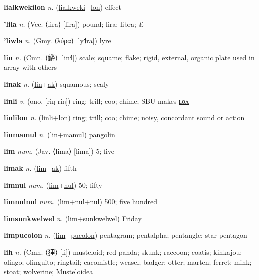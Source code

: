 \textbf{\hypertarget{lialkwekilon}{lialkwekilon}} \textit{n.} (\hyperlink{lialkweki}{lialkweki}+\allowbreak \hyperlink{lon}{lon})
effect

\textbf{\hypertarget{'lila}{'lila}} \textit{n.} (Vec. ⟨lira⟩ [lira])
pound; lira; libra; £

\textbf{\hypertarget{'liwla}{'liwla}} \textit{n.} (Gmy. ⟨λύρα⟩ [ly˦ra])
lyre

\textbf{\hypertarget{lin}{lin}} \textit{n.} (Cmn. ⟨{\chinese{}鳞}⟩ [lin˧˥])
scale; squame; flake; rigid, external, organic plate used in array with others

\textbf{\hypertarget{linak}{linak}} \textit{n.} (\hyperlink{lin}{lin}+\allowbreak \hyperlink{ak}{ak})
squamous; scaly

\textbf{\hypertarget{linli}{linli}} \textit{v.} (ono. [riŋ riŋ])
ring; trill; coo; chime; SBU makes \hyperlink{linlilon}{ʟᴏᴧ}

\textbf{\hypertarget{linlilon}{linlilon}} \textit{n.} (\hyperlink{linli}{linli}+\allowbreak \hyperlink{lon}{lon})
ring; trill; coo; chime; noisy, concordant sound or action

\textbf{\hypertarget{linmamul}{linmamul}} \textit{n.} (\hyperlink{lin}{lin}+\allowbreak \hyperlink{mamul}{mamul})
pangolin

\textbf{\hypertarget{lim}{lim}} \textit{num.} (Jav. ⟨lima⟩ [lima])
5; five

\textbf{\hypertarget{limak}{limak}} \textit{n.} (\hyperlink{lim}{lim}+\allowbreak \hyperlink{ak}{ak})
fifth

\textbf{\hypertarget{limnul}{limnul}} \textit{num.} (\hyperlink{lim}{lim}+\allowbreak \hyperlink{nul}{nul})
50; fifty

\textbf{\hypertarget{limnulnul}{limnulnul}} \textit{num.} (\hyperlink{lim}{lim}+\allowbreak \hyperlink{nul}{nul}+\allowbreak \hyperlink{nul}{nul})
500; five hundred

\textbf{\hypertarget{limsunkwelwel}{limsunkwelwel}} \textit{n.} (\hyperlink{lim}{lim}+\allowbreak \hyperlink{sunkwelwel}{sunkwelwel})
Friday

\textbf{\hypertarget{limpucolon}{limpucolon}} \textit{n.} (\hyperlink{lim}{lim}+\allowbreak \hyperlink{pucolon}{pucolon})
pentagram; pentalpha; pentangle; star pentagon

\textbf{\hypertarget{lih}{lih}} \textit{n.} (Cmn. ⟨{\chinese{}狸}⟩ [li])
musteloid; red panda; skunk; raccoon; coatis; kinkajou; olingo; olinguito; ringtail; cacomistle; weasel; badger; otter; marten; ferret; mink; stoat; wolverine; Musteloidea

